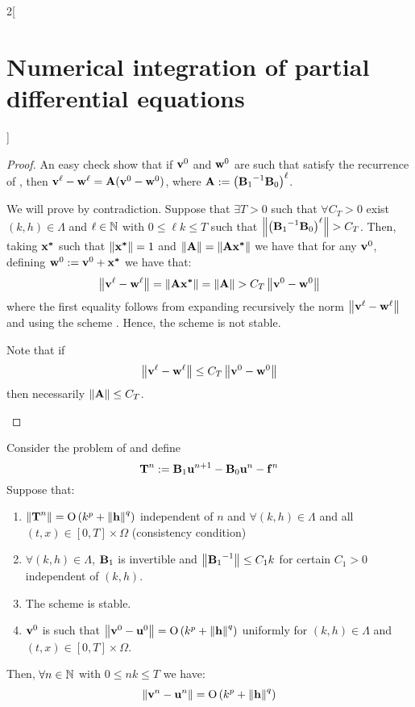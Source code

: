 \documentclass[../../../main_math.tex]{subfiles}
\begin{document}
\begin{multicols}{2}[\section{Numerical integration of partial differential equations}]
\begin{proof}
    An easy check show that if $\boldsymbol{\mathrm{v}}^0$ and $\boldsymbol{\mathrm{w}}^0$ are such that satisfy the recurrence of , then ${\boldsymbol{\mathrm{v}}^\ell -\boldsymbol{\mathrm{w}}^\ell}=\boldsymbol{\mathrm{A}}(\boldsymbol{\mathrm{v}}^0-\boldsymbol{\mathrm{w}}^0)$, where $\boldsymbol{\mathrm{A}}:= {\left({\boldsymbol{\mathrm{B}}_1}^{-1}\boldsymbol{\mathrm{B}}_0\right)}^\ell$.
    \begin{itemizeiff}
      We will prove by contradiction. Suppose that $\exists T>0$ such that $\forall C_T>0$ exist $(k,h)\in \Lambda$ and $\ell \in \mathbb{N}$ with $0\leq \ell k\leq T$ such that $\norm{{\left({\vf{B}_1}^{-1}\vf{B}_0\right)}^\ell}> C_T$. Then, taking $\boldsymbol{\mathrm{x^*}}$ such that $\left\|\boldsymbol{\mathrm{x^*}}\right\|=1$ and $\left\|\boldsymbol{\mathrm{A}}\right\|=\left\|\boldsymbol{\mathrm{A}}\boldsymbol{\mathrm{x^*}}\right\|$ we have that for any $\boldsymbol{\mathrm{v}}^0$, defining $\boldsymbol{\mathrm{w}}^0:=\boldsymbol{\mathrm{v}}^0+\boldsymbol{\mathrm{x^*}}$ we have that:
      \begin{multline*}
        \norm{\vf{v}^\ell -\vf{w}^\ell}= \norm{\vf{A} \vf{x^*}}=\norm{\vf{A}}>C_T\norm{\vf{v}^0-\vf{w}^0}
      \end{multline*}
      where the first equality follows from expanding recursively the norm $\left\|\boldsymbol{\mathrm{v}}^\ell -\boldsymbol{\mathrm{w}}^\ell\right\|$ and using the scheme . Hence, the scheme is not stable.
      \item Note that if
      $$
        \left\|\boldsymbol{\mathrm{v}}^\ell -\boldsymbol{\mathrm{w}}^\ell\right\|\leq C_T\left\|\boldsymbol{\mathrm{v}}^0-\boldsymbol{\mathrm{w}}^0\right\|
      $$
      then necessarily $\left\|\boldsymbol{\mathrm{A}}\right\|\leq C_T$.
    \end{itemizeiff}
  \end{proof}
  \begin{theorem}
    Consider the problem of  and define
    $$
      \boldsymbol{\mathrm{T}}^n:=\boldsymbol{\mathrm{B}}_1\boldsymbol{\mathrm{u}}^{n+1}-\boldsymbol{\mathrm{B}}_0\boldsymbol{\mathrm{u}}^n -\boldsymbol{\mathrm{f}}^n
    $$
    Suppose that:
    \begin{enumerate}
      \item $\left\|\boldsymbol{\mathrm{T}}^n\right\|=\mathrm{O}\left(k^p+\left\|\boldsymbol{\mathrm{h}}\right\|^q\right)$ independent of $n$ and $\forall (k,h)\in\Lambda$ and all $(t,x)\in[0,T]\times\Omega$ (consistency condition)
      \item $\forall (k,h)\in\Lambda$, $\boldsymbol{\mathrm{B}}_1$ is invertible and $\left\|{\boldsymbol{\mathrm{B}}_1}^{-1}\right\|\leq C_1k$ for certain $C_1>0$ independent of $(k,h)$.
      \item The scheme is stable.
      \item $\boldsymbol{\mathrm{v}}^0$ is such that $\left\|\boldsymbol{\mathrm{v}}^0-\boldsymbol{\mathrm{u}}^0\right\|=\mathrm{O}\left(k^p+\left\|\boldsymbol{\mathrm{h}}\right\|^q\right)$ uniformly for $(k,h)\in\Lambda$ and $(t,x)\in[0,T]\times\Omega$.
    \end{enumerate}
    Then, $\forall n\in\mathbb{N}$ with $0\leq nk\leq T$ we have:
    $$
      \left\|\boldsymbol{\mathrm{v}}^n-\boldsymbol{\mathrm{u}}^n\right\|=\mathrm{O}\left(k^p+\left\|\boldsymbol{\mathrm{h}}\right\|^q\right)
$$
\end{theorem}
\end{multicols}
\end{document}
